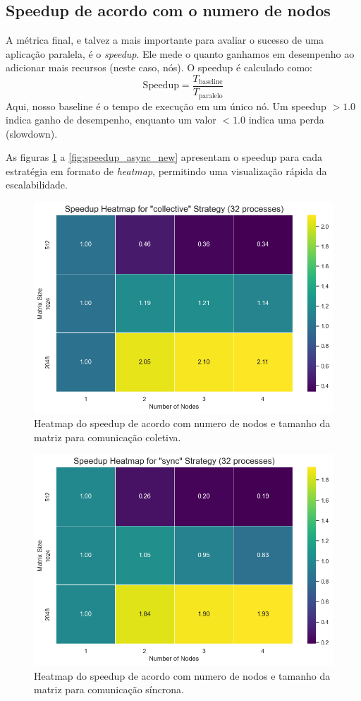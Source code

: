\documentclass{article}
\begin{document}
\subsection{Speedup de acordo com o numero de nodos}

A métrica final, e talvez a mais importante para avaliar o sucesso de uma aplicação paralela, é o \textit{speedup}. Ele mede o quanto ganhamos em desempenho ao adicionar mais recursos (neste caso, nós). O speedup é calculado como:
$$
\text{Speedup} = \frac{T_{\text{baseline}}}{T_{\text{paralelo}}}
$$
Aqui, nosso baseline é o tempo de execução em um único nó. Um speedup $> 1.0$ indica ganho de desempenho, enquanto um valor $< 1.0$ indica uma perda (slowdown).

As figuras \ref{fig:speedup_collective} a \ref{fig:speedup_async_new} apresentam o speedup para cada estratégia em formato de \textit{heatmap}, permitindo uma visualização rápida da escalabilidade.

\begin{figure}[H]
    \centering
    \includegraphics[width=0.8\linewidth]{images/speedup_collective.png}
    \caption{Heatmap do speedup de acordo com numero de nodos e tamanho da matriz para comunicação coletiva.}
    \label{fig:speedup_collective}
\end{figure}

\begin{figure}[H]
    \centering
    \includegraphics[width=0.8\linewidth]{images/speedup_sync.png}
    \caption{Heatmap do speedup de acordo com numero de nodos e tamanho da matriz para comunicação síncrona.}
    \label{fig:speedup_sync}
\end{figure}
\end{document}
